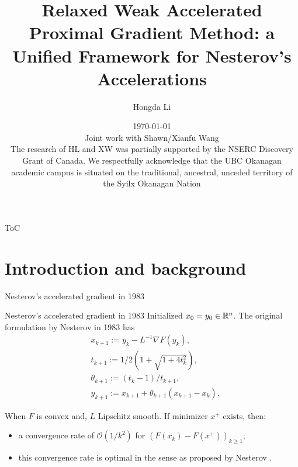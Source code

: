 \documentclass[11pt]{beamer}
\author[Hongda Li]{Hongda Li}
\title{
    Relaxed Weak Accelerated Proximal Gradient Method: a Unified Framework for Nesterov's Accelerations
}
\institute[UBCO]{
    University of British Columbia Okanagan
    \\
    WCOM 2025
}
\date[\today]{
    \today \\ \vspace{1cm} 
    \tiny{Joint work with Shawn/Xianfu Wang}\\ 
    \tiny{The research of HL and XW was partially supported by the NSERC Discovery Grant of Canada.}
    \tiny{We respectfully acknowledge that the UBC Okanagan academic campus is situated on the traditional, ancestral, unceded territory of the Syilx Okanagan Nation}
}
\theoremstyle{definition}
\begin{document}
\begin{frame}
    \titlepage
\end{frame}

\begin{frame}{ToC}
    \tableofcontents
\end{frame}

\section{Introduction and background}
    \begin{frame}{Nesterov's accelerated gradient in 1983}
        \begin{block}{Nesterov's accelerated gradient in 1983}
            Initialized $x_0 = y_0 \in \mathbb R^n$. 
            The original formulation by Nesterov in 1983 \cite{nesterov_method_1983} has
            {\small
            \begin{align*}
                & x_{k + 1} := y_k - L^{-1}\nabla F(y_k),
                \\
                & t_{k + 1} := 1/2\left(1 + \sqrt{1 + 4t_{k}^2}\right),
                \\
                & \theta_{k + 1} := (t_{k} - 1)/t_{k + 1}, \label{eqn:example-algorithm}
                \\
                & y_{k + 1} := x_{k + 1} + \theta_{k + 1}(x_{k + 1} - x_k).
            \end{align*}    
            }
        \end{block}
        When $F$ is convex and, $L$ Lipschitz smooth. 
        If minimizer $x^+$ exists, then: 
        \begin{itemize}
            \item a convergence rate of $\mathcal O(1/k^2)$ for $(F(x_k) - F(x^+))_{k \ge 1}$;
            \item this convergence rate is optimal in the sense as proposed by Nesterov \cite{nesterov_lectures_2018}.
        \end{itemize}
    \end{frame}
\end{document}
